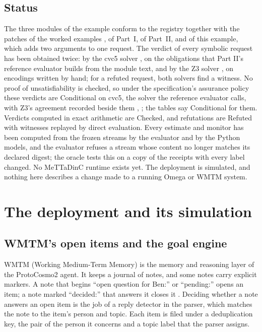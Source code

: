 \documentclass[11pt]{article}
\theoremstyle{definition}
\theoremstyle{plain}
\begin{document}
\subsection{Status}

The three modules of the example conform to the registry together with the patches of the worked
examples \cite{worked}, of Part~I, of Part~II, and of this example, which adds two arguments to one
request. The verdict of every symbolic request has been obtained twice: by the cvc5 solver
\cite{cvc5}, on the obligations that Part II's reference evaluator builds from the module text, and
by the Z3 solver \cite{z3}, on encodings written by hand; for a refuted request, both solvers find
a witness. No proof of unsatisfiability is checked, so under the specification's assurance policy
these verdicts are Conditional on cvc5, the solver the reference evaluator calls, with Z3's
agreement recorded beside them \cite[Section~2.2]{spec}, \cite[Section~7.2]{part2}; the tables say
Conditional for them. Verdicts computed in exact arithmetic are Checked, and refutations are Refuted
with witnesses replayed by direct evaluation. Every estimate and monitor has been computed from the
frozen streams by the evaluator and by the Python models, and the evaluator refuses a stream whose
content no longer matches its declared digest; the oracle tests this on a copy of the receipts with
every label changed. No MeTTaDinC runtime exists yet. The deployment is simulated, and nothing here
describes a change made to a running Omega or WMTM system.

\section{The deployment and its simulation}\label{sec:deployment}

\subsection{WMTM's open items and the goal engine}\label{sec:wmtm}

WMTM (Working Medium-Term Memory) is the memory and reasoning layer of the ProtoCosmo2 agent. It
keeps a journal of notes, and some notes carry explicit markers. A note that begins ``open
question for Ben:'' or ``pending:'' opens an item; a note marked ``decided:'' that answers it closes
it \cite{wmtm}. Deciding whether a note answers an open item is the job of a reply detector in the
parser, which matches the note to the item's person and topic. Each item is filed under a
deduplication key, the pair of the person it concerns and a topic label that the parser assigns.
\end{document}
